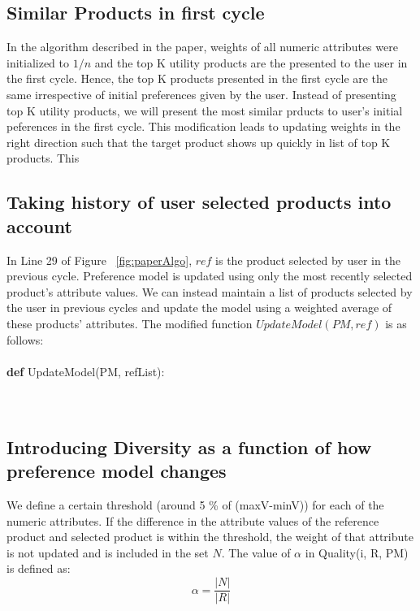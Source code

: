 \documentclass[10pt]{article}
\begin{document}
\subsection{Similar Products in first cycle}
In the algorithm described in the paper, weights of all numeric attributes were initialized to $1/n$ and the top K utility products are the presented to the user in the first cycle. Hence, the top K products presented in the first cycle are the same irrespective of initial preferences given by the user. 
Instead of presenting top K utility products, we will present the most similar prducts to user's initial peferences in the first cycle. This modification leads to updating weights in the right direction such that the target product shows up quickly in list of top K products. This 


\subsection{Taking history of user selected products into account}
\label {sec:history}
In Line 29 of Figure ~\ref{fig:paperAlgo},  $ref$ is the product selected by user in the previous cycle.
Preference model is updated using only the most recently selected product's attribute values.
We can instead maintain a list of products selected by the user in previous cycles and update the model using a weighted average of these products' attributes.
The modified function $UpdateModel(PM, ref)$ is as follows:\\
\\
\textbf{def} UpdateModel(PM, refList):\\
\noindent{}
\\
\\


\subsection{Introducing Diversity as a function of how preference model changes}
We define a certain threshold (around 5 \% of (maxV-minV)) for each of the numeric attributes. If the difference in the attribute values of the reference product and selected product is within the threshold, the weight of that attribute is not updated and is included in the set $N$. The value of $\alpha$ in Quality(i, R, PM) is defined as:
\begin{equation}
\alpha = \frac{|N|}{|R|}
\end{equation}
\end{document}
